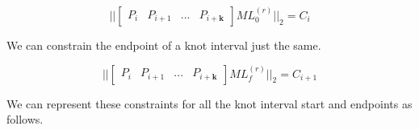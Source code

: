 \documentclass{article}
\begin{document}
\begin{equation}
   || \begin{bmatrix} P_{i} & P_{i+1} & ... & P_{i+\textbf{k}}\end{bmatrix} M L_0^{(r)} ||_2 = C_i
\end{equation}

We can constrain the endpoint of a knot interval just the same.

\begin{equation}
   || \begin{bmatrix} P_{i} & P_{i+1} & ... & P_{i+\textbf{k}}\end{bmatrix} M L_f^{(r)} ||_2 = C_{i+1}
\end{equation}

We can represent these constraints for all the knot interval start and endpoints as follows.
\end{document}
